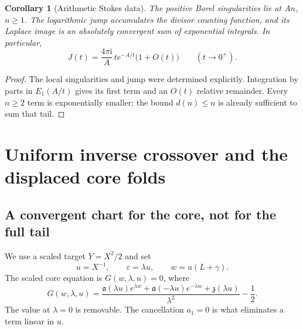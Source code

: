 \documentclass[11pt,a4paper]{article}
\numberwithin{equation}{section}
\newtheorem{corollary}[theorem]{Corollary}
\theoremstyle{definition}\newtheorem{definition}[theorem]{Definition}
\theoremstyle{remark}\newtheorem{remark}[theorem]{Remark}
\newcommand{\eps}{\varepsilon}
\newcommand{\ii}{\mathrm i}
\newcommand{\ua}{\mathfrak a}\newcommand{\uz}{\mathfrak z}
\begin{document}
\begin{corollary}[Arithmetic Stokes data]
The positive Borel singularities lie at $An$, $n\ge1$. The logarithmic
jump accumulates the divisor counting function, and its Laplace image is
an absolutely convergent sum of exponential integrals. In particular,
\begin{equation}\label{eq:J-leading}
 J(t)=\frac{4\pi\ii}{A}\,t e^{-A/t}\bigl(1+O(t)\bigr)
 \qquad(t\to0^+).
\end{equation}
\end{corollary}
\begin{proof}
The local singularities and jump were determined explicitly. Integration
by parts in $E_1(A/t)$ gives its first term and an $O(t)$ relative
remainder. Every $n\ge2$ term is exponentially smaller; the bound
$d(n)\le n$ is already sufficient to sum that tail.
\end{proof}

\section{Uniform inverse crossover and the displaced core folds}
\label{sec:crossover}

\subsection{A convergent chart for the core, not for the full tail}
We use a scaled target $Y=X^2/2$ and set
\begin{equation}\label{eq:crossover-variables}
 u=X^{-1},\qquad \eps=\lambda u,\qquad w=u(L+\gamma).
\end{equation}
The scaled core equation is $G(w,\lambda,u)=0$, where
\begin{equation}\label{eq:G}
 G(w,\lambda,u)=
 \frac{\ua(\lambda u)e^{\lambda w}
       +\ua(-\lambda u)e^{-\lambda w}+\uz(\lambda u)}{\lambda^2}
 -\frac12.
\end{equation}
The value at $\lambda=0$ is removable. The cancellation $a_1=0$ is
what eliminates a term linear in $u$.
\end{document}
